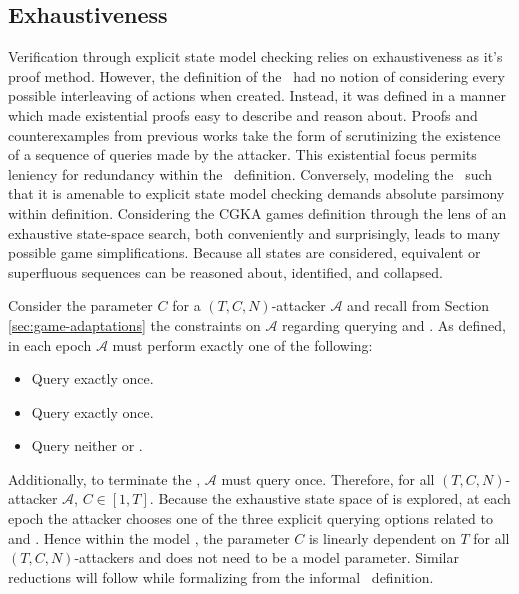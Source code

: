 \hypertarget{sec:exhaustiveness}{%
\subsection{Exhaustiveness}\label{sec:exhaustiveness}}

Verification through explicit state model checking relies on exhaustiveness as it's proof method.
However, the definition of the \CGKAsec\ had no notion of considering every possible interleaving of actions when created.
Instead, it was defined in a manner which made existential proofs easy to describe and reason about.
Proofs and counterexamples from previous works \autocite{alwen2019double, alwen2020security} take the form of scrutinizing the existence of a sequence of queries made by the attacker.
This existential focus permits leniency for redundancy within the \CGKAsec\ definition.
Conversely, modeling the \CGKAsec\ such that it is amenable to explicit state model checking demands absolute parsimony within definition.
Considering the CGKA games definition through the lens of an exhaustive state-space search, both conveniently and surprisingly, leads to many possible game simplifications.
Because all states are considered, equivalent or superfluous sequences can be reasoned about, identified, and collapsed.

Consider the parameter \(C\) for a \((T, C, N)\)-attacker \(\mathcal{A}\) and recall from Section \ref{sec:game-adaptations} the constraints on \(\mathcal{A}\) regarding querying  and .
As defined, in each epoch \(\mathcal{A}\) must perform exactly one of the following:

\begin{itemize}
  \item Query  exactly once.
  \item Query   exactly once.
  \item Query neither  or .
\end{itemize}

Additionally, to terminate the \CGKAsec, \(\mathcal{A}\) must query  once.
Therefore, for all \((T, C, N)\)-attacker \(\mathcal{A}\), \(C \in [1, T]\).
Because the exhaustive state space of is explored, at each epoch the attacker chooses one of the three explicit querying options related to  and .
Hence within the model , the parameter \(C\) is linearly dependent on \(T\) for all \((T, C, N)\)-attackers and does not need to be a model parameter.
Similar reductions will follow while formalizing  from the informal \CGKAsec\ definition.


